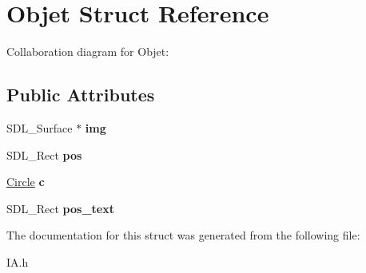 \hypertarget{structObjet}{}\section{Objet Struct Reference}
\label{structObjet}


Collaboration diagram for Objet\+:
\subsection*{Public Attributes}
\begin{DoxyCompactItemize}
\item 
\mbox{\label{structObjet_a0dac95199f82a456854968bfe257a14e}} 
S\+D\+L\+\_\+\+Surface $\ast$ {\bfseries img}
\item 
\mbox{\label{structObjet_aa96c8e462a0637c98ab3c192e7f1806a}} 
S\+D\+L\+\_\+\+Rect {\bfseries pos}
\item 
\mbox{\label{structObjet_a5ca2a21e73d9832faccdffca0466574f}} 
\hyperlink{structCircle}{Circle} {\bfseries c}
\item 
\mbox{\label{structObjet_a22b5f8635c29778f8a669585ec6ed6fd}} 
S\+D\+L\+\_\+\+Rect {\bfseries pos\+\_\+text}
\end{DoxyCompactItemize}


The documentation for this struct was generated from the following file\+:\begin{DoxyCompactItemize}
\item 
I\+A.\+h\end{DoxyCompactItemize}

